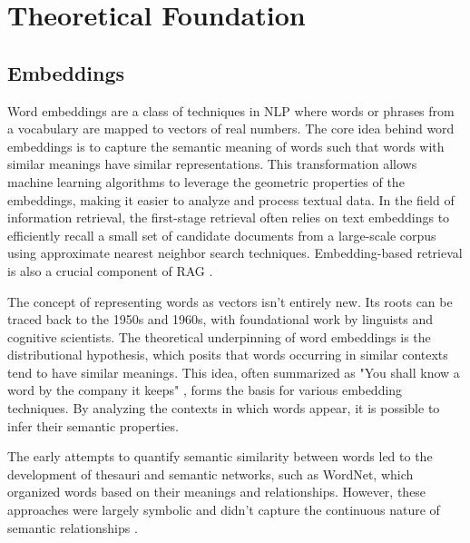 \section{Theoretical Foundation}

\subsection{Embeddings}
Word embeddings are a class of techniques in NLP where words or phrases from a vocabulary are mapped to vectors of real numbers. The core idea behind word embeddings is to capture the semantic meaning of words such that words with similar meanings have similar representations. This transformation allows machine learning algorithms to leverage the geometric properties of the embeddings, making it easier to analyze and process textual data. In the field of information retrieval, the first-stage retrieval often relies on text embeddings to efficiently recall a small set of candidate documents from a large-scale corpus using approximate nearest neighbor search techniques. Embedding-based retrieval is also a crucial component of RAG \cite{Wang.31Dec2023}.

The concept of representing words as vectors isn't entirely new. Its roots can be traced back to the 1950s and 1960s, with foundational work by linguists and cognitive scientists. The theoretical underpinning of word embeddings is the distributional hypothesis, which posits that words occurring in similar contexts tend to have similar meanings. This idea, often summarized as "You shall know a word by the company it keeps" \cite{J.R.Firth.1957}, forms the basis for various embedding techniques. By analyzing the contexts in which words appear, it is possible to infer their semantic properties.

The early attempts to quantify semantic similarity between words led to the development of thesauri and semantic networks, such as WordNet, which organized words based on their meanings and relationships. However, these approaches were largely symbolic and didn't capture the continuous nature of semantic relationships \cite{GeorgeA.Miller.1995}.

